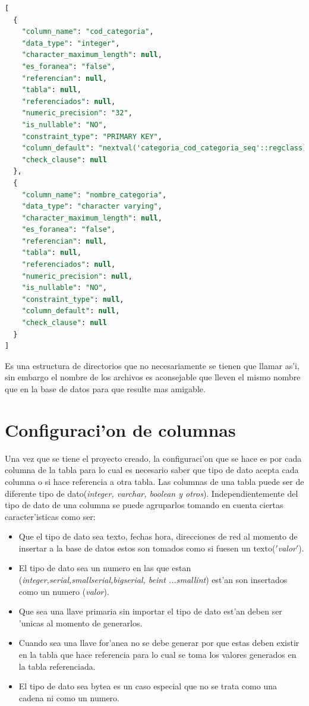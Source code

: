 \begin{itemize}
\begin{lstlisting}[caption={Ejemplo archivo tables},label={jsontables},language=sql]
[
  {
    "column_name": "cod_categoria",
    "data_type": "integer",
    "character_maximum_length": null,
    "es_foranea": "false",
    "referencian": null,
    "tabla": null,
    "referenciados": null,
    "numeric_precision": "32",
    "is_nullable": "NO",
    "constraint_type": "PRIMARY KEY",
    "column_default": "nextval('categoria_cod_categoria_seq'::regclass)",
    "check_clause": null
  },
  {
    "column_name": "nombre_categoria",
    "data_type": "character varying",
    "character_maximum_length": null,
    "es_foranea": "false",
    "referencian": null,
    "tabla": null,
    "referenciados": null,
    "numeric_precision": null,
    "is_nullable": "NO",
    "constraint_type": null,
    "column_default": null,
    "check_clause": null
  }
]
\end{lstlisting} 
\end{itemize}

Es una estructura de directorios que no necesariamente se tienen que llamar as'i, sin embargo el nombre de los archivos es aconsejable que lleven el mismo nombre que en la base de datos para que resulte mas amigable.
\section{Configuraci'on de columnas}
Una vez que se tiene el proyecto creado, la configuraci'on que se hace es por cada columna de la tabla para lo cual es necesario saber que tipo de dato acepta cada columna o si hace referencia a otra tabla.
Las columnas de una tabla puede ser de diferente tipo de dato(\textit{integer, varchar, boolean y otros}). Independientemente del tipo de dato de una columna se puede agruparlos tomando en cuenta ciertas caracter'isticas como ser:
\begin{itemize}
\item Que el tipo de dato sea texto, fechas hora, direcciones de red al momento de insertar a la base de datos estos son tomados como si fuesen un texto($'$\textit{valor}$'$).
\item El tipo de dato sea un numero en las que estan (\textit{integer,serial,smallserial,bigserial, beint ...smallint}) est'an son insertados como un numero (\textit{valor}).
\item Que sea una llave primaria sin importar el tipo de dato est'an deben ser 'unicas al momento de generarlos.
\item Cuando sea una llave for'anea no se debe generar por que estas deben existir en la tabla que hace referencia para lo cual se toma los valores generados en la tabla referenciada.
\item El tipo de dato sea bytea es un caso especial que no se trata como una cadena ni como un numero.
\end{itemize}
